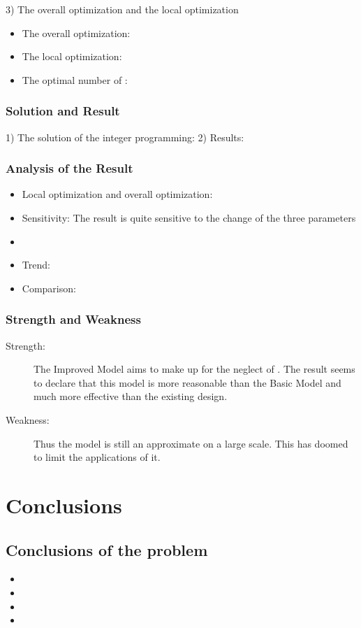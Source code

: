 \documentclass{apmcmthesis}
\begin{document}
3) The overall optimization and the local optimization

\begin{itemize}
\item The overall optimization:
\item The local optimization:
\item The optimal number of        :
\end{itemize}



\subsubsection{Solution and Result}
1) The solution of the integer programming:
2) Results:
\subsubsection{Analysis of the Result}
\begin{itemize}
\item Local optimization and overall optimization:
\item Sensitivity: The result is quite sensitive to the change of the three parameters
\item
\item Trend:
\item Comparison:
\end{itemize}
\subsubsection{Strength and Weakness}

\begin{description}
\item[Strength:] The Improved Model aims to make up for the neglect of         . The result seems to declare that this model is more reasonable than the Basic Model and much more effective than the existing design.
\item[Weakness:] Thus the model is still an approximate on a large scale. This has doomed to limit the applications of it.
\end{description}

\section{Conclusions}

\subsection{Conclusions of the problem}
\begin{itemize}
\item 	
\item
\item
\item
\end{itemize}	
\end{document}
